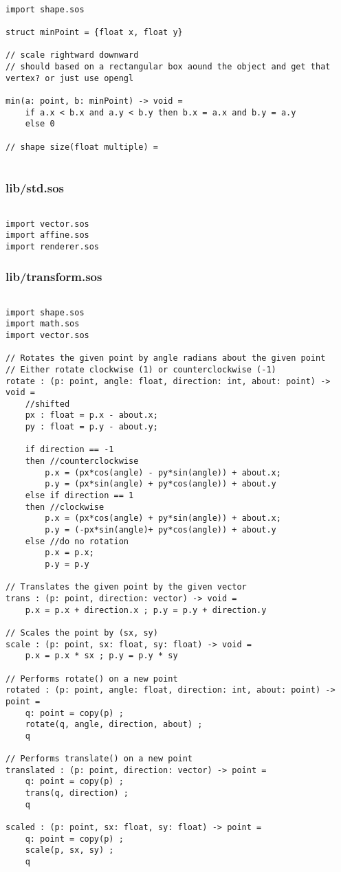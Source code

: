 \documentclass[main.tex]{subfiles}
\begin{document}
\begin{lstlisting}

import shape.sos

struct minPoint = {float x, float y}

// scale rightward downward
// should based on a rectangular box aound the object and get that vertex? or just use opengl

min(a: point, b: minPoint) -> void =
    if a.x < b.x and a.y < b.y then b.x = a.x and b.y = a.y
    else 0

// shape size(float multiple) =
    

\end{lstlisting}

\subsubsection{lib/std.sos}

\begin{lstlisting}

import vector.sos
import affine.sos
import renderer.sos
\end{lstlisting}

\subsubsection{lib/transform.sos}

\begin{lstlisting}

import shape.sos
import math.sos
import vector.sos

// Rotates the given point by angle radians about the given point
// Either rotate clockwise (1) or counterclockwise (-1)
rotate : (p: point, angle: float, direction: int, about: point) -> void =
    //shifted
    px : float = p.x - about.x;
    py : float = p.y - about.y;

    if direction == -1
    then //counterclockwise
        p.x = (px*cos(angle) - py*sin(angle)) + about.x;
        p.y = (px*sin(angle) + py*cos(angle)) + about.y
    else if direction == 1
    then //clockwise
        p.x = (px*cos(angle) + py*sin(angle)) + about.x;
        p.y = (-px*sin(angle)+ py*cos(angle)) + about.y
    else //do no rotation
        p.x = p.x;
        p.y = p.y 

// Translates the given point by the given vector
trans : (p: point, direction: vector) -> void = 
    p.x = p.x + direction.x ; p.y = p.y + direction.y

// Scales the point by (sx, sy)
scale : (p: point, sx: float, sy: float) -> void =
    p.x = p.x * sx ; p.y = p.y * sy

// Performs rotate() on a new point
rotated : (p: point, angle: float, direction: int, about: point) -> point =
    q: point = copy(p) ;
    rotate(q, angle, direction, about) ;
    q

// Performs translate() on a new point
translated : (p: point, direction: vector) -> point =
    q: point = copy(p) ;
    trans(q, direction) ;
    q

scaled : (p: point, sx: float, sy: float) -> point = 
    q: point = copy(p) ; 
    scale(p, sx, sy) ;
    q
\end{lstlisting}
\end{document}

